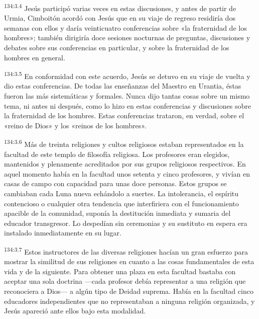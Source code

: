 \par 
\textsuperscript{134:3.4} Jesús participó varias veces en estas discusiones, y antes de partir de Urmia, Cimboitón acordó con Jesús que en su viaje de regreso residiría dos semanas con ellos y daría veinticuatro conferencias sobre «la fraternidad de los hombres»; también dirigiría doce sesiones nocturnas de preguntas, discusiones y debates sobre sus conferencias en particular, y sobre la fraternidad de los hombres en general.

\par 
\textsuperscript{134:3.5} En conformidad con este acuerdo, Jesús se detuvo en su viaje de vuelta y dio estas conferencias. De todas las enseñanzas del Maestro en Urantia, éstas fueron las más sistemáticas y formales. Nunca dijo tantas cosas sobre un mismo tema, ni antes ni después, como lo hizo en estas conferencias y discusiones sobre la fraternidad de los hombres. Estas conferencias trataron, en verdad, sobre el «reino de Dios» y los «reinos de los hombres».

\par 
\textsuperscript{134:3.6} Más de treinta religiones y cultos religiosos estaban representados en la facultad de este templo de filosofía religiosa. Los profesores eran elegidos, mantenidos y plenamente acreditados por sus grupos religiosos respectivos. En aquel momento había en la facultad unos setenta y cinco profesores, y vivían en casas de campo con capacidad para unas doce personas. Estos grupos se cambiaban cada Luna nueva echándolo a suertes. La intolerancia, el espíritu contencioso o cualquier otra tendencia que interfiriera con el funcionamiento apacible de la comunidad, suponía la destitución inmediata y sumaria del educador transgresor. Lo despedían sin ceremonias y su sustituto en espera era instalado inmediatamente en su lugar.

\par 
\textsuperscript{134:3.7} Estos instructores de las diversas religiones hacían un gran esfuerzo para mostrar la similitud de sus religiones en cuanto a las cosas fundamentales de esta vida y de la siguiente. Para obtener una plaza en esta facultad bastaba con aceptar una sola doctrina ---cada profesor debía representar a una religión que reconociera a Dios--- a algún tipo de Deidad suprema. Había en la facultad cinco educadores independientes que no representaban a ninguna religión organizada, y Jesús apareció ante ellos bajo esta modalidad.

